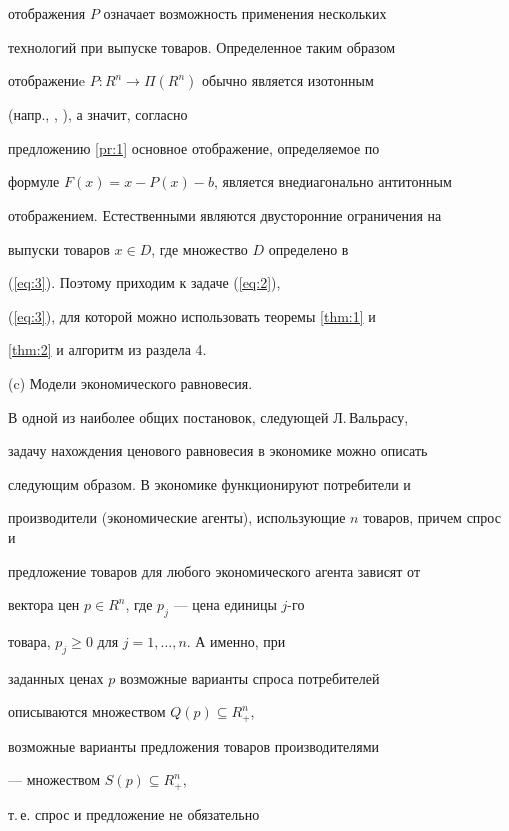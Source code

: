 отображения $P$ означает возможность применения нескольких


технологий при выпуске товаров.  Определенное таким образом


отображениe $P: R^n \to \Pi (R^{n})$ обычно является изотонным


(напр., \cite{Opo86}, \cite{Ers02}), а значит, согласно


предложению \ref{pr:1} основное отображение, определяемое по


формуле $F(x)=x-P(x)-b$, является внедиагонально антитонным


отображением. Естественными являются двусторонние ограничения на


выпуски товаров $x \in D$, где множество $D$ определено в


(\ref{eq:3}). Поэтому приходим к задаче (\ref{eq:2}),


(\ref{eq:3}), для которой можно использовать теоремы \ref{thm:1} и


\ref{thm:2} и алгоритм из раздела 4.


\medskip





(c) Модели экономического равновесия.





В одной из наиболее общих постановок, следующей Л.\,Вальрасу,


задачу нахождения ценового равновесия в экономике можно описать


следующим образом. В экономике функционируют потребители и


производители (экономические агенты), использующие $n$ товаров, причем спрос и


предложение товаров для любого экономического агента зависят от


вектора цен $ p \in R^{n}$, где $ p_{j}$ --- цена единицы $j$-го


товара, $ p_{j}\geq 0$ для $j=1,\dotsc, n$. А именно, при


заданных ценах $p$ возможные варианты спроса потребителей


описываются множеством $Q(p)\subseteq R_{+}^{n}$,


возможные варианты предложения товаров производителями


--- множеством $S(p)\subseteq R_{+}^{n}$,


т.\,е. спрос и предложение не обязательно


